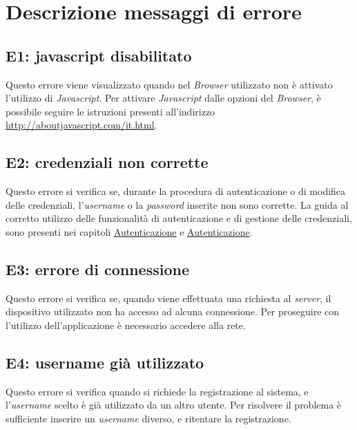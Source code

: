 \section{Descrizione messaggi di errore}
\label{errori}

\subsection{E1: javascript disabilitato}
\label{e1}
Questo errore viene visualizzato quando nel \textit{Browser} utilizzato non è attivato l'utilizzo di \textit{Javascript}.
Per attivare \textit{Javascript} dalle opzioni del \textit{Browser}, è possibile seguire le istruzioni presenti all'indirizzo \url{http://aboutjavascript.com/it.html}.

\subsection{E2: credenziali non corrette}
\label{e2}
Questo errore si verifica se, durante la procedura di autenticazione o di modifica delle credenziali, l'\textit{username} o la \textit{password} inserite non sono corrette.
La guida al corretto utilizzo delle funzionalità di autenticazione  e di gestione delle credenziali, sono presenti nei capitoli \hyperref[autenticazione]{Autenticazione} e \hyperref[autenticazione]{Autenticazione}.

\subsection{E3: errore di connessione}
\label{e3}
Questo errore si verifica se, quando viene effettuata una richiesta al \textit{server}, il dispositivo utilizzato non ha accesso ad alcuna connessione.
Per proseguire con l'utilizzo dell'applicazione è necessario accedere alla rete.

\subsection{E4: username già utilizzato}
\label{e4}
Questo errore si verifica quando si richiede la registrazione al sistema, e l'\textit{username} scelto è già utilizzato da un altro utente.
Per risolvere il problema è sufficiente inserire un \textit{username} diverso, e ritentare la registrazione.

